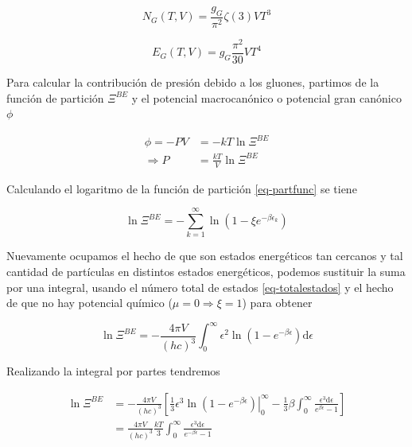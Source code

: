  \begin{equation}\label{eq-BE-Ntotalgluons}
{N}_{G}(T,V) = \frac{{g}_{G}}{{\pi}^{2}} \zeta(3)V{T}^{3}
\end{equation}

\begin{equation}\label{eq-BE-Etotalgluons}
{E}_{G}(T,V) = {g}_{G}\frac{{\pi}^{2}}{30} V{T}^{4}
\end{equation}

Para calcular la contribución de presión debido a los gluones, partimos de la función de partición ${\Xi}^{BE}$ y el potencial macrocanónico o potencial gran canónico $\phi$

\begin{equation}\label{eq-BE-P1}
\begin{split}
\phi = -PV  & = -k T \ln {\Xi}^{BE} \\ 
\Rightarrow P & = \frac{kT}{V} \ln {\Xi}^{BE}
\end{split}
\end{equation}

Calculando el logaritmo de la función de partición \eqref{eq-partfunc} se tiene

\begin{equation}
\ln {\Xi}^{BE} = - \sum_{k=1}^{\infty} \ln\left(1 - \xi{e}^{-\beta {\epsilon}_{k}}\right)
\end{equation}

Nuevamente ocupamos el hecho de que son estados energéticos tan cercanos y tal cantidad de partículas en distintos estados energéticos, podemos sustituir la suma por una integral, usando el número total de estados \eqref{eq-totalestados} y el hecho de que no hay potencial químico ($\mu=0 \Rightarrow \xi=1$) para obtener

\begin{equation}
\ln {\Xi}^{BE} = - \frac{4\pi V}{(hc)^{3}} \int_{0}^{\infty} {\epsilon}^{2} \ln \left(1 - {e}^{-\beta\epsilon} \right) \mathrm{d} \epsilon
\end{equation}

Realizando la integral por partes tendremos

\begin{equation}
\begin{split}
\ln {\Xi}^{BE} & = - \frac{4\pi V}{(hc)^{3}} \left[ \left. \frac{1}{3} {\epsilon}^{3} \ln \left( 1 - {e}^{-\beta \epsilon}\right) \right|_{0}^{\infty} - \frac{1}{3} \beta \int_{0}^{\infty} \frac{{\epsilon}^{3} \mathrm{d}\epsilon}{{e}^{\beta \epsilon} - 1} \right] \\ 
& = \frac{4\pi V}{(hc)^{3}} \frac{kT}{3} \int_{0}^{\infty} \frac{{\epsilon}^{3} \mathrm{d} \epsilon}{{e}^{-\beta \epsilon} - 1}
\end{split}
\end{equation}

